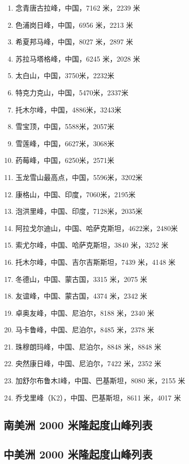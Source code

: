 \documentclass[10pt,twocolumn,letterpaper]{article}
\begin{document}
\begin{flushleft}
\begin{enumerate}
    \item 念青唐古拉峰，中国，7162 米，2239 米
    \item 色浦岗日峰，中国，6956 米，2213 米
    \item 希夏邦马峰，中国，8027 米，2897 米
    \item 苏拉马塔格峰，中国，6245 米，2028 米
    \item 太白山，中国，3750米，2232米
    \item 特克力克山，中国，5470米，2337米
    \item 托木尔峰，中国，4886米，3243米
    \item 雪宝顶，中国，5588米，2057米
    \item 雪莲峰，中国，6627米，3068米
    \item 药莓峰，中国，6250米，2571米
    \item 玉龙雪山最高点，中国，5596米，3202米
    \item 康格山，中国、印度，7060米，2195米
    \item 泡洪里峰，中国、印度，7128米，2035米
    \item 阿拉戈尔迪山，中国、哈萨克斯坦，4622米，2480米
    \item 索尤尔峰，中国、哈萨克斯坦，3840 米，3252 米
    \item 托木尔峰，中国、吉尔吉斯斯坦，7439 米，4148 米
    \item 冬德山，中国、蒙古国，3315 米，2075 米
    \item 友谊峰，中国、蒙古国，4374 米，2342 米
    \item 卓奥友峰，中国、尼泊尔，8188 米，2340 米
    \item 马卡鲁峰，中国、尼泊尔，8485 米，2378 米
    \item 珠穆朗玛峰，中国、尼泊尔，8848 米，8848 米
    \item 央然康日峰，中国、尼泊尔，7422 米，2352 米
    \item 加舒尔布鲁木I峰，中国、巴基斯坦，8080 米，2155 米
    \item 乔戈里峰（K2），中国、巴基斯坦，8611 米，4017 米
\end{enumerate}
\end{flushleft}

\subsection{南美洲 2000 米隆起度山峰列表}
\subsection{中美洲 2000 米隆起度山峰列表}
\end{document}
